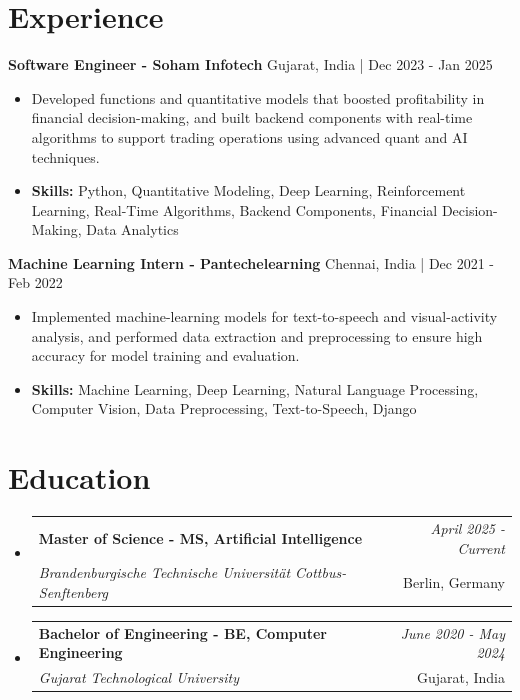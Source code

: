 \documentclass[a4paper,11pt]{article}
\makeatletter
\newcommand{\resumeSubheading}[4]{
\vspace{0.5mm}\item
    \begin{tabular*}{\linewidth}[t]{l@{\extracolsep{\fill}}r}
        \textbf{#1} & \textit{\footnotesize{#4}} \\
        \textit{\footnotesize{#3}} &  \footnotesize{#2}\\
    \end{tabular*}
    \vspace{-2.4mm}
}
\makeatother
\begin{document}
\section{\textbf{Experience}}


\vspace{1mm}
  \textbf{Software Engineer - Soham Infotech} \hfill Gujarat, India | Dec 2023 - Jan 2025
\vspace{-1.5mm} %
\begin{itemize}
  \item Developed functions and quantitative models that boosted profitability in financial decision-making, and built backend components with real-time algorithms to support trading operations using advanced quant and AI techniques.

\vspace{-2mm}
  \item \textbf{Skills:} Python, Quantitative Modeling, Deep Learning, Reinforcement Learning, Real-Time Algorithms, Backend Components, Financial Decision-Making, Data Analytics
\end{itemize}

\vspace{1mm}
  \textbf{Machine Learning Intern - Pantechelearning} \hfill Chennai, India | Dec 2021 - Feb 2022
\vspace{-1.5mm} %
\begin{itemize}
  \item Implemented machine-learning models for text-to-speech and visual-activity analysis, and performed data extraction and preprocessing to ensure high accuracy for model training and evaluation.
\vspace{-2mm}
  \item \textbf{Skills:} Machine Learning, Deep Learning, Natural Language Processing, Computer Vision, Data Preprocessing, Text-to-Speech, Django
\end{itemize}\section{\textbf{Education}}
\vspace{-0.4mm}

\begin{itemize}[leftmargin=0.15in, label={}]
\resumeSubheading
{Master of Science - MS, Artificial Intelligence }{Berlin, Germany}
{Brandenburgische Technische Universität Cottbus-Senftenberg  }{April 2025 - Current}

\vspace{1.0mm} %
\resumeSubheading
{Bachelor of Engineering - BE, Computer Engineering  }{Gujarat, India}
{Gujarat Technological University }{June 2020 - May 2024}

\end{itemize}
\end{document}
